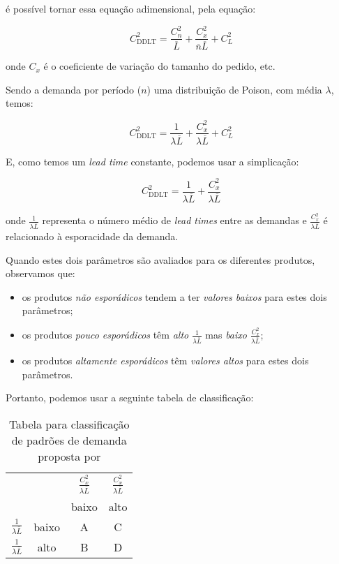 \documentclass{book}
\begin{document}
é possível tornar essa equação adimensional, pela equação:

\begin{equation}
C_\textrm{DDLT}^2 = \frac{C_n^2}{\overline{L}} + \frac{C_x^2}{\overline{n} \overline{L}} + C_L^2
\end{equation}

onde $C_x$ é o coeficiente de variação do tamanho do pedido, etc. 

Sendo a demanda por período ($n$) uma distribuição de Poison, com média $\lambda$, temos:

\begin{equation}
C_\textrm{DDLT}^2 = \frac{1}{\lambda \overline{L}} + \frac{C_x^2}{\lambda \overline{L}} + C_L^2
\end{equation}

E, como temos um \emph{lead time} constante, podemos usar a simplicação:

\begin{equation}
C_\textrm{DDLT}^2 = \frac{1}{\lambda \overline{L}} + \frac{C_x^2}{\lambda \overline{L}}
\end{equation}

onde $\frac{1}{\lambda \overline{L}}$ representa o número médio de \emph{lead times} entre as demandas e $\frac{C_x^2}{\lambda \overline{L}}$ é relacionado à esporacidade da demanda.

Quando estes dois parâmetros são avaliados para os diferentes produtos, observamos que:

\begin{itemize}
\item os produtos \emph{não esporádicos} tendem a ter \emph{valores baixos} para estes dois parâmetros;
\item os produtos \emph{pouco esporádicos} têm \emph{alto $\frac{1}{\lambda \overline{L}}$} mas \emph{baixo $\frac{C_x^2}{\lambda \overline{L}}$};
\item os produtos \emph{altamente esporádicos} têm \emph{valores altos} para estes dois parâmetros.
\end{itemize}

Portanto, podemos usar a seguinte tabela de classificação:

\begin{table}[h]
\begin{center}
\begin{tabular}[c]{c c c c }
& & $\frac{C_x^2}{\lambda \overline{L}}$ & $\frac{C_x^2}{\lambda \overline{L}}$ \\
& & baixo & alto \\
$\frac{1}{\lambda \overline{L}}$ & baixo & A & C \\
$\frac{1}{\lambda \overline{L}}$ & alto & B & D \\
\end{tabular}
\caption{Tabela para classificação de padrões de demanda proposta por \cite{Williams1984}}
\label{tab:metodoDeWillians}
\end{center}
\end{table}
\end{document}
